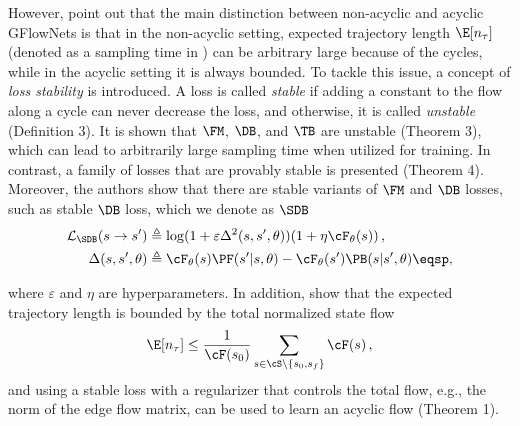 However, \citet{brunswic2024theory} point out that the main distinction between non-acyclic and acyclic GFlowNets is that in the non-acyclic setting, expected trajectory length $\E[n_{\tau}]$ (denoted as a sampling time in \cite{brunswic2024theory}) can be arbitrary large because of the cycles, while in the acyclic setting it is always bounded. To tackle this issue, a concept of \textit{loss stability} is introduced. A loss is called \textit{stable} if adding a constant to the flow along a cycle can never decrease the loss, and otherwise, it is called \textit{unstable} (Definition 3). It is shown that $\FM$, $\DB$, and $\TB$ are unstable (Theorem 3), which can lead to arbitrarily large sampling time when utilized for training. In contrast, a family of losses that are provably stable is presented (Theorem 4). Moreover, the authors show that there are stable variants of $\FM$ and $\DB$ losses, such as stable $\DB$ loss, which we denote as $\SDB$
\begin{equation} \label{eq:StableDB_loss}
\begin{split}
\mathcal{L}_{\SDB}(s \to s^{\prime})  
 & \triangleq \log(1 + \varepsilon \Delta^2(s,s',\theta))  (1 + \eta \cF_{\theta}(s))\,, \\\
 \Delta(s,s', \theta) &\triangleq \cF_{\theta}(s) \PF(s' | s, \theta) 
 - \cF_{\theta}(s')\PB(s | s', \theta)\eqsp,
\end{split}
\end{equation}
\vspace{-0.6cm}

where $\varepsilon$ and $\eta$ are hyperparameters. In addition, \cite{brunswic2024theory} show that the  expected trajectory length is bounded by the total normalized state flow
\begin{equation}
\label{eq:len_bound}
     \E[n_{\tau}] \leq \frac{1}{\cF(s_0)} \sum_{s \in \cS \setminus \{s_0, s_f\}} \cF(s)\,,
\end{equation}
and using a stable loss with a regularizer that controls the total flow, e.g., the norm of the edge flow matrix, can be used to learn an acyclic flow (Theorem 1).



